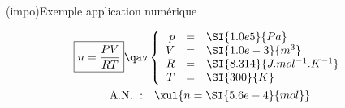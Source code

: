 \documentclass[a4paper, 10pt, garamond, oneside]{book}
\begin{document}
{\begin{tcb}(impo){Exemple application numérique}
	\vspace*{-10pt}
	\begin{minipage}[c]{0.45\linewidth}
		\begin{gather*}
			\boxed{n = \frac{PV}{RT}}
			\qav
			\left\{
			\begin{array}{rcl}
				p & = & \SI{1.0e5}{Pa}                \\
				V & = & \SI{1.0e-3}{m^3}              \\
				R & = & \SI{8.314}{J.mol^{-1}.K^{-1}} \\
				T & = & \SI{300}{K}
			\end{array}
			\right.\\
			\mathrm{A.N.~:}\quad
			\xul{n = \SI{5.6e-4}{mol}}
		\end{gather*}
	\end{minipage}
	\hfill
\end{tcb}
\newpage
}

\setcounter{section}{0}
\end{document}
